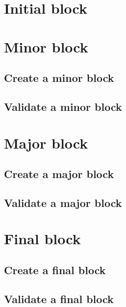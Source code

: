 \documentclass[../hydrozoa.tex]{subfiles}
\begin{document}
\section{Initial block}%
\label{h:l2-initial-block}%


\section{Minor block}%
\label{h:l2-minor-block}%


\subsection{Create a minor block}%
\label{h:l2-minor-block-create}%


\subsection{Validate a minor block}%
\label{h:l2-minor-block-validate}%


\section{Major block}%
\label{h:l2-major-block}%


\subsection{Create a major block}%
\label{h:l2-major-block-create}%


\subsection{Validate a major block}%
\label{h:l2-major-block-validate}%



\section{Final block}%
\label{h:l2-final-block}%


\subsection{Create a final block}%
\label{h:l2-final-block-create}%


\subsection{Validate a final block}%
\label{h:l2-final-block-validate}%

\end{document}
